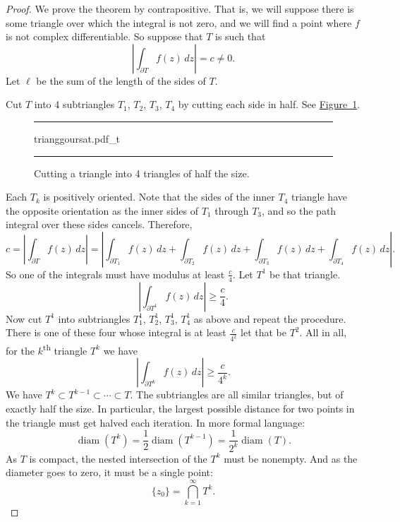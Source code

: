 \documentclass[12pt,openany]{book}
\newcommand{\abs}[1]{\left\lvert {#1} \right\rvert}
\theoremstyle{plain}
\theoremstyle{remark}
\theoremstyle{definition}
\newenvironment{myfig}{%
\begin{figure}[h!t]
\noindent\rule{\textwidth}{0.4pt}\vspace{12pt}\par\centering}%
{\par\noindent\rule{\textwidth}{0.4pt}
\end{figure}}
\theoremstyle{exercise}
\theoremstyle{example}
\newcommand{\figureref}[1]{\hyperref[#1]{Figure~\ref*{#1}}}
\begin{document}
\begin{proof}
We prove the theorem by contrapositive.  That is, we will suppose there is
some triangle over which the integral is not zero, and we will find a point
where $f$ is not complex differentiable.  So suppose that $T$ is such
that
\begin{equation*}
\abs{\int_{\partial T} f(z) \, dz} = c \not= 0 .
\end{equation*}
Let $\ell$ be the sum of the length of the sides of $T$.

Cut $T$ into 4 subtriangles
$T_1$, $T_2$, $T_3$, $T_4$ by cutting each side in half.  See
\figureref{fig:trianggoursat}.
\begin{myfig}
{trianggoursat.pdf_t}
\caption{Cutting a triangle into 4 triangles of half the size.%
\label{fig:trianggoursat}}
\end{myfig}

Each $T_k$ is positively oriented.
Note that the sides of the inner $T_4$ triangle have the opposite
orientation as the inner sides of $T_1$ through $T_3$, and
so the path integral over these sides cancels.  Therefore,
\begin{equation*}
c = 
\abs{\int_{\partial T} f(z) \, dz }
=
\abs{\int_{\partial T_1} f(z) \, dz 
+
\int_{\partial T_2} f(z) \, dz 
+
\int_{\partial T_3} f(z) \, dz 
+
\int_{\partial T_4} f(z) \, dz } .
\end{equation*}
So one of the integrals must have modulus at least $\frac{c}{4}$.  Let $T^1$
be that triangle.
\begin{equation*}
\abs{\int_{\partial T^1} f(z) \, dz } \geq \frac{c}{4} .
\end{equation*}
Now cut $T^1$ into subtriangles
$T_1^1$, $T_2^1$, $T_3^1$, $T_4^1$ as above and repeat the procedure.  There
is one of these four whose integral is at least $\frac{c}{4^2}$ let that be
$T^2$.  All in all, for the $k$\textsuperscript{th} triangle $T^k$ we have
\begin{equation*}
\abs{\int_{\partial T^k} f(z) \, dz } \geq \frac{c}{4^k} .
\end{equation*}
We have $T^k \subset T^{k-1} \subset \cdots \subset T$.
The subtriangles are all similar triangles, but of exactly half the size.
In particular,
the largest possible distance for two points in the triangle must
get halved each iteration.  In more formal language:
\begin{equation*}
\operatorname{diam}(T^k) =
\frac{1}{2} \operatorname{diam}(T^{k-1})
=
\frac{1}{2^k} \operatorname{diam}(T) .
\end{equation*}
As $T$ is compact, the nested intersection of the $T^k$ must be nonempty.
And as the diameter goes to zero, it must be a single point:
\begin{equation*}
\{ z_0 \} = \bigcap_{k=1}^\infty T^k .
\end{equation*}


\end{proof}
\end{document}
